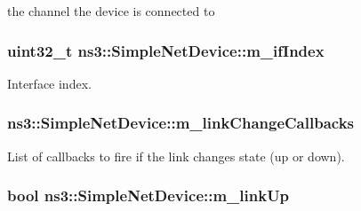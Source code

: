 the channel the device is connected to 

\subsubsection[{\texorpdfstring{m\+\_\+if\+Index}{m_ifIndex}}]{\setlength{\rightskip}{0pt plus 5cm}uint32\+\_\+t ns3\+::\+Simple\+Net\+Device\+::m\+\_\+if\+Index\hspace{0.3cm}{\ttfamily [private]}}\hypertarget{classns3_1_1SimpleNetDevice_ac2deeed77b8fcf06389ca7c1b56ac01f}{}\label{classns3_1_1SimpleNetDevice_ac2deeed77b8fcf06389ca7c1b56ac01f}


Interface index. 

\subsubsection[{\texorpdfstring{m\+\_\+link\+Change\+Callbacks}{m_linkChangeCallbacks}}]{ ns3\+::\+Simple\+Net\+Device\+::m\+\_\+link\+Change\+Callbacks\hspace{0.3cm}{\ttfamily [private]}}\hypertarget{classns3_1_1SimpleNetDevice_a209f4157e8168195227cc6271b6f77f8}{}\label{classns3_1_1SimpleNetDevice_a209f4157e8168195227cc6271b6f77f8}
List of callbacks to fire if the link changes state (up or down). 
\subsubsection[{\texorpdfstring{m\+\_\+link\+Up}{m_linkUp}}]{\setlength{\rightskip}{0pt plus 5cm}bool ns3\+::\+Simple\+Net\+Device\+::m\+\_\+link\+Up\hspace{0.3cm}{\ttfamily [private]}}\hypertarget{classns3_1_1SimpleNetDevice_a923c93f1baab5ab677054a569eb88c53}{}\label{classns3_1_1SimpleNetDevice_a923c93f1baab5ab677054a569eb88c53}


